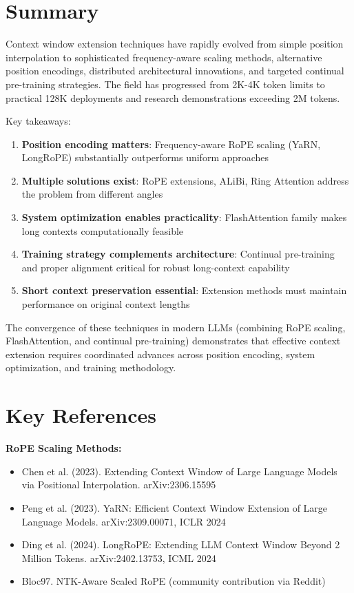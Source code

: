 \documentclass[11pt,letterpaper]{article}
\begin{document}
\section{Summary}

Context window extension techniques have rapidly evolved from simple position interpolation to sophisticated frequency-aware scaling methods, alternative position encodings, distributed architectural innovations, and targeted continual pre-training strategies. The field has progressed from 2K-4K token limits to practical 128K deployments and research demonstrations exceeding 2M tokens.

Key takeaways:
\begin{enumerate}[leftmargin=*]
    \item \textbf{Position encoding matters}: Frequency-aware RoPE scaling (YaRN, LongRoPE) substantially outperforms uniform approaches
    \item \textbf{Multiple solutions exist}: RoPE extensions, ALiBi, Ring Attention address the problem from different angles
    \item \textbf{System optimization enables practicality}: FlashAttention family makes long contexts computationally feasible
    \item \textbf{Training strategy complements architecture}: Continual pre-training and proper alignment critical for robust long-context capability
    \item \textbf{Short context preservation essential}: Extension methods must maintain performance on original context lengths
\end{enumerate}

The convergence of these techniques in modern LLMs (combining RoPE scaling, FlashAttention, and continual pre-training) demonstrates that effective context extension requires coordinated advances across position encoding, system optimization, and training methodology.

\section*{Key References}

\textbf{RoPE Scaling Methods:}
\begin{itemize}[leftmargin=*]
    \item Chen et al. (2023). Extending Context Window of Large Language Models via Positional Interpolation. arXiv:2306.15595
    \item Peng et al. (2023). YaRN: Efficient Context Window Extension of Large Language Models. arXiv:2309.00071, ICLR 2024
    \item Ding et al. (2024). LongRoPE: Extending LLM Context Window Beyond 2 Million Tokens. arXiv:2402.13753, ICML 2024
    \item Bloc97. NTK-Aware Scaled RoPE (community contribution via Reddit)
\end{itemize}
\end{document}
